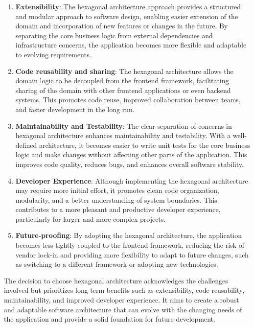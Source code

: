 \documentclass[../design.tex]{subfiles}
\begin{document}
\begin{enumerate}
	\item\textbf{Extensibility}: The hexagonal architecture approach provides a
	structured and modular approach to software design, enabling easier
	extension of the domain and incorporation of new features or changes in
	the future. By separating the core business logic from external
	dependencies and infrastructure concerns, the application becomes more
	flexible and adaptable to evolving requirements.
	\item\textbf{Code reusability and sharing}: The hexagonal architecture
	allows the domain logic to be decoupled from the frontend framework,
	facilitating sharing of the domain with other frontend applications or
	even backend systems. This promotes code reuse, improved collaboration
	between teams, and faster development in the long run.
	\item\textbf{Maintainability and Testability}: The clear separation of
	concerns in hexagonal architecture enhances maintainability and
	testability. With a well-defined architecture, it becomes easier to write
	unit tests for the core business logic and make changes without affecting
	other parts of the application. This improves code quality, reduces bugs,
	and enhances overall software stability.
	\item\textbf{Developer Experience}: Although implementing the hexagonal
	architecture may require more initial effort, it promotes clean code
	organization, modularity, and a better understanding of system boundaries.
	This contributes to a more pleasant and productive developer experience,
	particularly for larger and more complex projects.
	\item\textbf{Future-proofing}: By adopting the hexagonal architecture, the
	application becomes less tightly coupled to the frontend framework, reducing
	the risk of vendor lock-in and providing more flexibility to adapt to future
	changes, such as switching to a different framework or adopting new
	technologies.
\end{enumerate}
The decision to choose hexagonal architecture acknowledges the challenges
involved but prioritizes long-term benefits such as extensibility, code
reusability, maintainability, and improved developer experience. It aims to
create a robust and adaptable software architecture that can evolve with the
changing needs of the application and provide a solid foundation for future
development.
\end{document}
